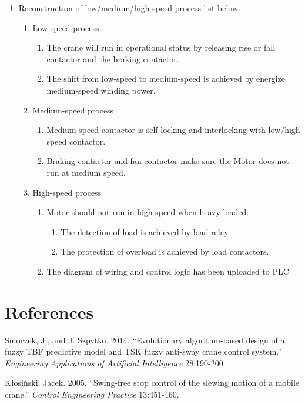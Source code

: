 \documentclass[a4paper]{article}
\renewcommand{\Large}{\fontsize{12pt}{\baselineskip}\selectfont}
\begin{document}
\begin{enumerate}
\begin{enumerate}
	\end{enumerate} 
\item Reconstruction of low/medium/high-speed process list below.
	\begin{enumerate}
\item Low-speed process
		\begin{enumerate}
\item The crane will run in operational status by releasing rise or fall  contactor and the braking contactor.
\item The shift from low-speed to medium-speed is achieved by energize medium-speed winding power.
		\end{enumerate}
\item Medium-speed process
	\begin{enumerate}
\item Medium speed contactor is self-locking and  interlocking with  low/high speed contactor.
\item Braking contactor and fan contactor make sure the Motor does not run at medium speed.
	\end{enumerate}
\item High-speed process
	\begin{enumerate}
\item Motor should not run in high speed when heavy loaded.
	\begin{enumerate}
\item The detection of load is achieved  by load relay.
\item The protection of overload is achieved by load contactors.
	\end{enumerate}
\item The diagram of wiring and control logic has been uploaded to PLC 
	\end{enumerate} 
	\end{enumerate}
	\end{enumerate}

\section*{ \Large References}
\setlength{\hangindent}{4em}
Smoczek, J., and J. Szpytko. 2014. ``Evolutionary algorithm-based design of a fuzzy TBF predictive model and TSK fuzzy anti-sway crane control system.''
\textit{Engineering Applications of Artificial Intelligence} 28:190-200. \par

\setlength{\hangindent}{4em}
Kłosiński, Jacek. 2005. ``Swing-free stop control of the slewing motion of a mobile crane.''
\textit{Control Engineering Practice} 13:451-460. \par
\end{document}
